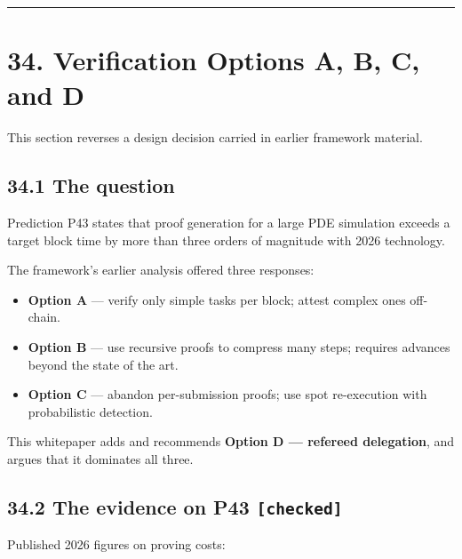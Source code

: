 \documentclass[
  11pt]{report}
\providecommand{\tightlist}{%
  \setlength{\itemsep}{0pt}\setlength{\parskip}{0pt}}
\begin{document}
\begin{center}\rule{0.5\linewidth}{0.5pt}\end{center}

\hypertarget{verification-options-a-b-c-and-d}{%
\chapter{34. Verification Options A, B, C, and
D}\label{verification-options-a-b-c-and-d}}

This section reverses a design decision carried in earlier framework
material.

\hypertarget{the-question}{%
\section{34.1 The question}\label{the-question}}

Prediction P43 states that proof generation for a large PDE simulation
exceeds a target block time by more than three orders of magnitude with
2026 technology.

The framework's earlier analysis offered three responses:

\begin{itemize}
\tightlist
\item
  \textbf{Option A} --- verify only simple tasks per block; attest
  complex ones off-chain.
\item
  \textbf{Option B} --- use recursive proofs to compress many steps;
  requires advances beyond the state of the art.
\item
  \textbf{Option C} --- abandon per-submission proofs; use spot
  re-execution with probabilistic detection.
\end{itemize}

This whitepaper adds and recommends \textbf{Option D --- refereed
delegation}, and argues that it dominates all three.

\hypertarget{the-evidence-on-p43-checked}{%
\section{\texorpdfstring{34.2 The evidence on P43
\texttt{{[}checked{]}}}{34.2 The evidence on P43 {[}checked{]}}}\label{the-evidence-on-p43-checked}}

Published 2026 figures on proving costs:
\end{document}
